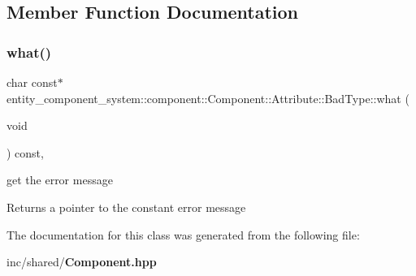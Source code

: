 \subsection{Member Function Documentation}
\label{classentity__component__system_1_1component_1_1_component_1_1_attribute_1_1_bad_type_a67a9eb74ffeb8fbceb96b70d79d8c627} 
\subsubsection{what()}
{\footnotesize\ttfamily char const$\ast$ entity\+\_\+component\+\_\+system\+::component\+::\+Component\+::\+Attribute\+::\+Bad\+Type\+::what (\begin{DoxyParamCaption}\item[{void}]{ }\end{DoxyParamCaption}) const\hspace{0.3cm}{\ttfamily [inline]}, {\ttfamily [noexcept]}}



get the error message 

\begin{DoxyReturn}{Returns}
a pointer to the constant error message 
\end{DoxyReturn}


The documentation for this class was generated from the following file\+:\begin{DoxyCompactItemize}
\item 
inc/shared/{\bf Component.\+hpp}\end{DoxyCompactItemize}
